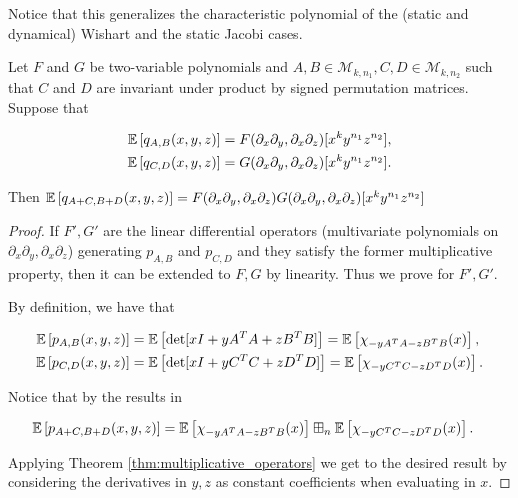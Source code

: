     Notice that this generalizes the characteristic polynomial of the (static and dynamical) Wishart and the static Jacobi cases. 

    \begin{theorem} \label{thm:multivariate_operators}
        Let $F$ and $G$ be two-variable polynomials and $A,B \in \mathcal M_{k,n_1}, C,D \in \mathcal M_{k,n_2}$ such that $C$ and $D$ are invariant under product by signed permutation matrices. Suppose that

         \begin{align*}
            \mathbb E \left[ q_{A,B}(x,y,z) \right] &= F(\partial_x \partial_y,\partial_x\partial_z)[x^ky^{n_1}z^{n_2}],\\ 
            \mathbb E \left[ q_{C,D}(x,y,z) \right] &= G(\partial_x \partial_y,\partial_x\partial_z)[x^ky^{n_1}z^{n_2}].
         \end{align*}

         Then $\mathbb E \left[ q_{A+C, B+D}(x,y,z) \right] = F(\partial_x \partial_y,\partial_x\partial_z)G(\partial_x \partial_y,\partial_x\partial_z)[x^ky^{n_1}z^{n_2}]$
    \end{theorem}

    \begin{proof}
        If $F',G'$ are the linear differential operators (multivariate polynomials on $\partial_x\partial_y, \partial_x\partial_z$) generating $p_{A,B}$ and $p_{C,D}$ and they satisfy the former multiplicative property, then it can be extended to $F,G$ by linearity. Thus we prove for $F', G'$. 


        By definition, we have that 
        
        \begin{align*}
            \mathbb E \left[  p_{A, B}(x,y,z)  \right] &= \mathbb E \left[  \det[ x I + y A^T A + z B^TB ]  \right] = \mathbb E \left[ \chi_{-yA^TA -zB^TB}(x) \right],\\
            \mathbb E \left[  p_{C, D}(x,y,z)  \right] &= \mathbb E \left[  \det[ x I + y C^TC + z D^TD ]  \right] = \mathbb E \left[ \chi_{-yC^TC -zD^TD}(x) \right].
        \end{align*}

        Notice that by the results in 

        \begin{align*}
            \mathbb E \left[ p_{A+C, B+D}(x,y,z) \right] &= \mathbb E \left[ \chi_{-yA^TA -zB^TB}(x) \right] \boxplus_n \mathbb E \left[ \chi_{-yC^TC -zD^TD}(x) \right].
        \end{align*}

        Applying Theorem \ref{thm:multiplicative_operators} we get to the desired result by considering the derivatives in $y,z$ as constant coefficients when evaluating in $x$.

    \end{proof}

